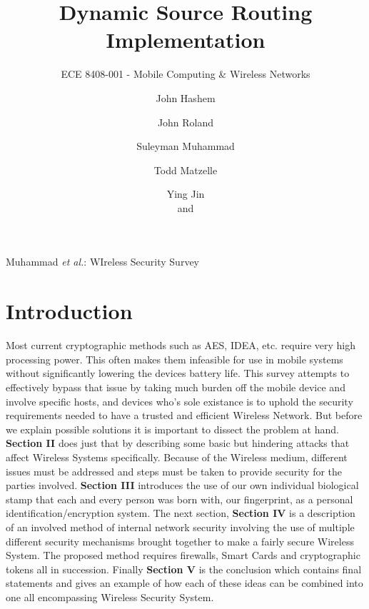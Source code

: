 \documentclass[11pt,onecolumn,cspaper,compsoc]{IEEEtran}
\begin{document}
\title{Dynamic Source Routing Implementation}

\author{ECE 8408-001 - Mobile Computing & Wireless Networks\\\and
John Hashem\\\and
John Roland\\\and
Suleyman Muhammad\\\and
Todd Matzelle\\\and
Ying Jin\\and}

%
{Muhammad \MakeLowercase{\textit{et al.}}: WIreless Security Survey}


\maketitle


\section{Introduction}

Most current cryptographic methods such as AES, IDEA, etc. require very high processing power. This often makes them infeasible for use in 
mobile systems without significantly lowering the devices battery life. This survey attempts to effectively bypass that issue by taking much
burden off the mobile device and involve specific hosts, and devices who's sole existance is to uphold the security requirements needed
to have a trusted and efficient Wireless Network. But before we explain possible solutions it is important to dissect the problem at hand. 
\textbf{Section II} does just that by describing some basic but hindering attacks that affect Wireless Systems specifically. Because of the Wireless 
medium, different issues must be addressed and steps must be taken to provide security for the parties involved. \textbf{Section III} introduces the 
use of our own individual biological stamp that each and every person was born with, our fingerprint, as a personal identification/encryption system. 
The next section, \textbf{Section IV} is a description of an involved method of internal network security involving the use of multiple different 
security mechanisms brought together to make a fairly secure Wireless System. The proposed method requires firewalls, Smart Cards and cryptographic 
tokens all in succession. Finally \textbf{Section V} is the conclusion which contains final statements and gives an example of how each of these 
ideas can be combined into one all encompassing Wireless Security System.
\end{document}
